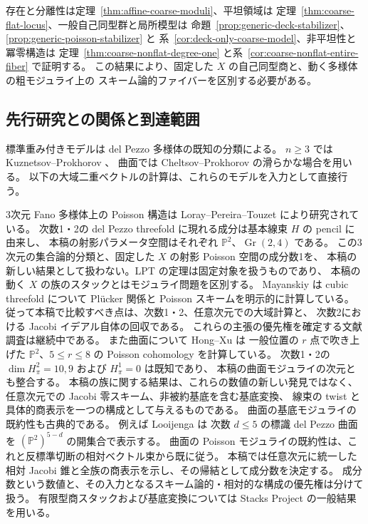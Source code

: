\documentclass[a4paper,11pt]{ltjsarticle}
\numberwithin{equation}{section}
\theoremstyle{plain}
\theoremstyle{definition}
\newcommand{\Gr}{\operatorname{Gr}}
\begin{document}
存在と分離性は定理~\ref{thm:affine-coarse-moduli}、平坦領域は
定理~\ref{thm:coarse-flat-locus}、一般自己同型群と局所模型は
命題~\ref{prop:generic-deck-stabilizer}、\ref{prop:generic-poisson-stabilizer} と
系~\ref{cor:deck-only-coarse-model}、非平坦性と冪零構造は
定理~\ref{thm:coarse-nonflat-degree-one} と系~\ref{cor:coarse-nonflat-entire-fiber} で証明する。
この結果により、固定した $X$ の自己同型商と、動く多様体の粗モジュライ上の
スキーム論的ファイバーを区別する必要がある。

\subsection{先行研究との関係と到達範囲}
標準重み付きモデルは del Pezzo 多様体の既知の分類による。
$n\geq3$ では Kuznetsov--Prokhorov \cite[Theorem 1.2(i),(ii)]{KP2023}、
曲面では Cheltsov--Prokhorov \cite[Theorem 2.5]{CP2021} の滑らかな場合を用いる。
以下の大域二重ベクトルの計算は、これらのモデルを入力として直接行う。

3次元 Fano 多様体上の Poisson 構造は Loray--Pereira--Touzet
\cite[Theorems 7.1, 9.1]{LPT2013} により研究されている。
次数1・2の del Pezzo threefold に現れる成分は基本線束 $H$ の pencil に由来し、
本稿の射影パラメータ空間はそれぞれ $\mathbb P^2$、$\Gr(2,4)$ である。
この3次元の集合論的分類と、固定した $X$ の射影 Poisson 空間の成分数1を、
本稿の新しい結果として扱わない。LPT の定理は固定対象を扱うものであり、
本稿の動く $X$ の族のスタックとはモジュライ問題を区別する。
Mayanskiy \cite[Introduction, Theorem 1]{Mayanskiy2015} は cubic threefold について
Pl\"ucker 関係と Poisson スキームを明示的に計算している。
従って本稿で比較すべき点は、次数1・2、任意次元での大域計算と、
次数2における Jacobi イデアル自体の回収である。
これらの主張の優先権を確定する文献調査は継続中である。
また曲面について Hong--Xu \cite[Theorem 3.9]{HongXu2011} は
一般位置の $r$ 点で吹き上げた $\mathbb P^2$、$5\leq r\leq8$ の
Poisson cohomology を計算している。
次数1・2の $\dim H^2_\pi=10,9$ および $H^1_\pi=0$ は既知であり、
本稿の曲面モジュライの次元とも整合する。
本稿の族に関する結果は、これらの数値の新しい発見ではなく、
任意次元での Jacobi 零スキーム、非被約基底を含む基底変換、
線束の twist と具体的商表示を一つの構成として与えるものである。
曲面の基底モジュライの既約性も古典的である。
例えば Looijenga \cite[\S4, p.~21 of the author's manuscript]{Looijenga2008} は
次数 $d\le5$ の標識 del Pezzo 曲面を $(\mathbb P^2)^{5-d}$ の開集合で表示する。
曲面の Poisson モジュライの既約性は、これと反標準切断の相対ベクトル束から既に従う。
本稿では任意次元に統一した相対 Jacobi 錐と全族の商表示を示し、その帰結として成分数を決定する。
成分数という数値と、その入力となるスキーム論的・相対的な構成の優先権は分けて扱う。
有限型商スタックおよび基底変換については
Stacks Project \cite[Tags 0B91, 06FI, 0DSL]{StacksProject} の一般結果を用いる。
\end{document}
